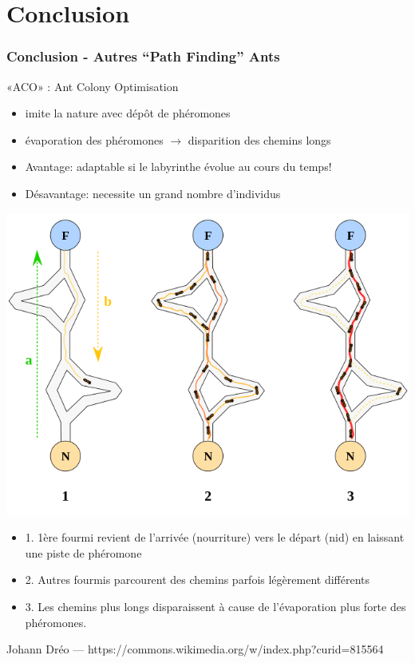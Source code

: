 \documentclass[]{beamer}
\begin{document}
\section{Conclusion}
\begin{frame}
  \frametitle{Conclusion - Autres ``Path Finding'' Ants}
  «ACO» : Ant Colony Optimisation
   \begin{itemize}
   \item imite la nature avec dépôt de phéromones
   \item évaporation des phéromones $\rightarrow$ disparition des chemins longs
   \item Avantage: adaptable si le labyrinthe évolue au cours du temps!
   \item Désavantage: necessite un grand nombre d'individus
   \end{itemize}
  \begin{minipage}{.45\linewidth}
   \includegraphics[width=\linewidth]{Aco_branches.svg.png}
  \end{minipage}
  \begin{minipage}{.5\linewidth}
   \begin{itemize}
	\item 1. 1ère fourmi revient de l'arrivée (nourriture) vers le départ (nid) en laissant une piste de phéromone
   \item 2. Autres fourmis parcourent des chemins parfois légèrement différents
   \item 3. Les chemins plus longs disparaissent à cause de l'évaporation plus forte des phéromones.
   \end{itemize}
  \end{minipage}
  Johann Dréo — https://commons.wikimedia.org/w/index.php?curid=815564
\end{frame}
\end{document}
